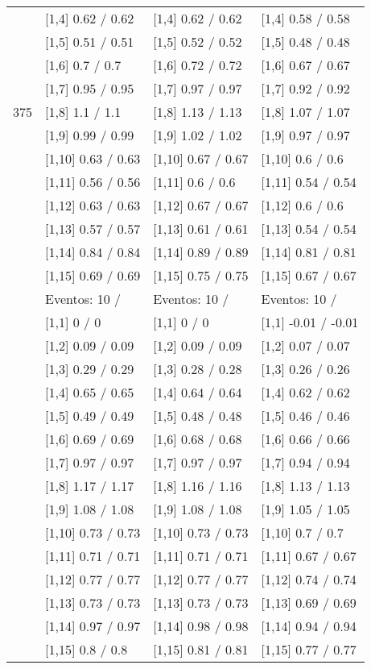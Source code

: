 \begin{table}
\begin{tabular}[t]{llll}
\addlinespace
 & {}[1,4] 0.62  / 0.62 & {}[1,4] 0.62  / 0.62 & {}[1,4] 0.58  / 0.58\\
 & {}[1,5] 0.51  / 0.51 & {}[1,5] 0.52  / 0.52 & {}[1,5] 0.48  / 0.48\\
 & {}[1,6] 0.7  / 0.7 & {}[1,6] 0.72  / 0.72 & {}[1,6] 0.67  / 0.67\\
 & {}[1,7] 0.95  / 0.95 & {}[1,7] 0.97  / 0.97 & {}[1,7] 0.92  / 0.92\\
375 & {}[1,8] 1.1  / 1.1 & {}[1,8] 1.13  / 1.13 & {}[1,8] 1.07  / 1.07\\
\addlinespace
 & {}[1,9] 0.99  / 0.99 & {}[1,9] 1.02  / 1.02 & {}[1,9] 0.97  / 0.97\\
 & {}[1,10] 0.63  / 0.63 & {}[1,10] 0.67  / 0.67 & {}[1,10] 0.6  / 0.6\\
 & {}[1,11] 0.56  / 0.56 & {}[1,11] 0.6  / 0.6 & {}[1,11] 0.54  / 0.54\\
 & {}[1,12] 0.63  / 0.63 & {}[1,12] 0.67  / 0.67 & {}[1,12] 0.6  / 0.6\\
 & {}[1,13] 0.57  / 0.57 & {}[1,13] 0.61  / 0.61 & {}[1,13] 0.54  / 0.54\\
\addlinespace
 & {}[1,14] 0.84  / 0.84 & {}[1,14] 0.89  / 0.89 & {}[1,14] 0.81  / 0.81\\
 & {}[1,15] 0.69  / 0.69 & {}[1,15] 0.75  / 0.75 & {}[1,15] 0.67  / 0.67\\
 & Eventos:  10 / & Eventos:  10 / & Eventos:  10 /\\
 & {}[1,1] 0  / 0 & {}[1,1] 0  / 0 & {}[1,1] -0.01  / -0.01\\
 & {}[1,2] 0.09  / 0.09 & {}[1,2] 0.09  / 0.09 & {}[1,2] 0.07  / 0.07\\
\addlinespace
 & {}[1,3] 0.29  / 0.29 & {}[1,3] 0.28  / 0.28 & {}[1,3] 0.26  / 0.26\\
 & {}[1,4] 0.65  / 0.65 & {}[1,4] 0.64  / 0.64 & {}[1,4] 0.62  / 0.62\\
 & {}[1,5] 0.49  / 0.49 & {}[1,5] 0.48  / 0.48 & {}[1,5] 0.46  / 0.46\\
 & {}[1,6] 0.69  / 0.69 & {}[1,6] 0.68  / 0.68 & {}[1,6] 0.66  / 0.66\\
 & {}[1,7] 0.97  / 0.97 & {}[1,7] 0.97  / 0.97 & {}[1,7] 0.94  / 0.94\\
\addlinespace
500 & {}[1,8] 1.17  / 1.17 & {}[1,8] 1.16  / 1.16 & {}[1,8] 1.13  / 1.13\\
 & {}[1,9] 1.08  / 1.08 & {}[1,9] 1.08  / 1.08 & {}[1,9] 1.05  / 1.05\\
 & {}[1,10] 0.73  / 0.73 & {}[1,10] 0.73  / 0.73 & {}[1,10] 0.7  / 0.7\\
 & {}[1,11] 0.71  / 0.71 & {}[1,11] 0.71  / 0.71 & {}[1,11] 0.67  / 0.67\\
 & {}[1,12] 0.77  / 0.77 & {}[1,12] 0.77  / 0.77 & {}[1,12] 0.74  / 0.74\\
\addlinespace
 & {}[1,13] 0.73  / 0.73 & {}[1,13] 0.73  / 0.73 & {}[1,13] 0.69  / 0.69\\
 & {}[1,14] 0.97  / 0.97 & {}[1,14] 0.98  / 0.98 & {}[1,14] 0.94  / 0.94\\
 & {}[1,15] 0.8  / 0.8 & {}[1,15] 0.81  / 0.81 & {}[1,15] 0.77  / 0.77\\
\bottomrule
\end{tabular}
\end{table}
